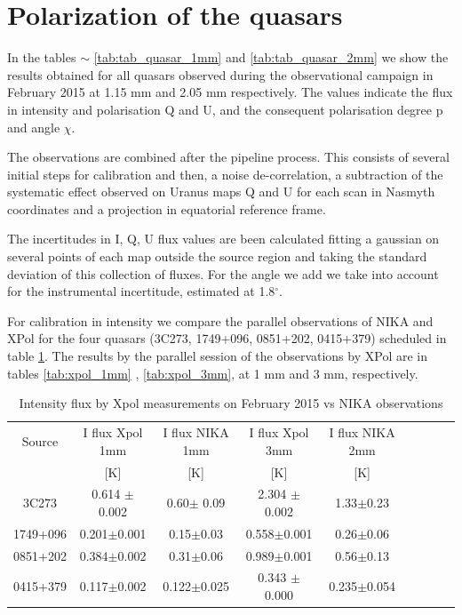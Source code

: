 \documentclass[a4paper,10pt]{article}
\begin{document}
\pagebreak

\section{Polarization of the quasars}
In the tables $\sim$ \ref{tab:tab_quasar_1mm} and \ref{tab:tab_quasar_2mm} we show the results obtained for all quasars observed during the observational campaign in February 2015 at 1.15 mm and 2.05 mm respectively.
The values indicate the flux in intensity and polarisation Q and U, and the consequent polarisation degree p and angle \rm{$\chi$}.

The observations are combined after the pipeline process. This consists of several initial steps for calibration and then, a noise de-correlation, a subtraction of the systematic effect observed on Uranus maps Q and U for each scan in Nasmyth coordinates and a projection in equatorial reference frame. 

The incertitudes in I, Q, U flux values are been calculated fitting a gaussian on several points of each map outside the source region and taking the standard deviation of this collection of fluxes. For the angle we add we take into account for the instrumental incertitude, estimated at 1.8$^\circ$.

For calibration in intensity we compare the parallel observations of NIKA and XPol for the four quasars (3C273, 1749+096, 0851+202, 0415+379) scheduled in table \ref{tab:calib}. The results by the parallel session of the observations by XPol are in tables \ref{tab:xpol_1mm} , \ref{tab:xpol_3mm}, at 1 mm and 3 mm, respectively. 

\begin{table}[h!]
\caption{Intensity flux by Xpol measurements on February 2015 vs NIKA observations}
\begin{center}
\begin{tabular}{ccccccccc}
\hline
\hline
Source & I flux Xpol 1mm & I flux NIKA 1mm& I flux Xpol 3mm & I flux NIKA 2mm\\
 & [K] & [K] & [K] & [K]\\
\hline
3C273 & 0.614 $\pm$0.002 & 0.60$\pm$ 0.09 &2.304 $\pm$ 0.002 & 1.33$\pm$0.23\\
1749+096 & 0.201$\pm$0.001 & 0.15$\pm$0.03 & 0.558$\pm$0.001 & 0.26$\pm$0.06\\
0851+202 & 0.384$\pm$0.002 & 0.31$\pm$0.06& 0.989$\pm$0.001 & 0.56$\pm$0.13 \\
0415+379 & 0.117$\pm$0.002 & 0.122$\pm$0.025 & 0.343 $\pm$0.000 & 0.235$\pm$0.054\\
\hline
\end{tabular}
\end{center}
\label{tab:calib}
\end{table}
\end{document}
